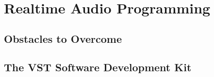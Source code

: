 \chapter{Realtime Audio Programming}

\section{Obstacles to Overcome}
\section{The VST Software Development Kit}
